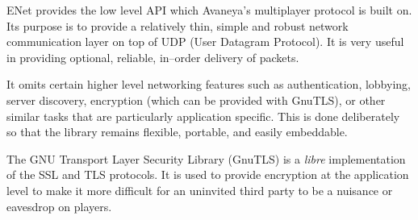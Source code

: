 

\startitemize[4]

ENet provides the low level API which Avaneya's multiplayer protocol is built on. Its purpose is to provide a relatively thin, simple and robust network communication layer on top of UDP (User Datagram Protocol). It is very useful in providing optional, reliable, in--order delivery of packets. 

It omits certain higher level networking features such as authentication, lobbying, server discovery, encryption (which can be provided with GnuTLS), or other similar tasks that are particularly application specific. This is done deliberately so that the library remains flexible, portable, and easily embeddable.


The GNU Transport Layer Security Library (GnuTLS) is a {\it libre} implementation of the SSL and TLS protocols. It is used to provide encryption at the application level to make it more difficult for an uninvited third party to be a nuisance or eavesdrop on players.
\stopitemize

